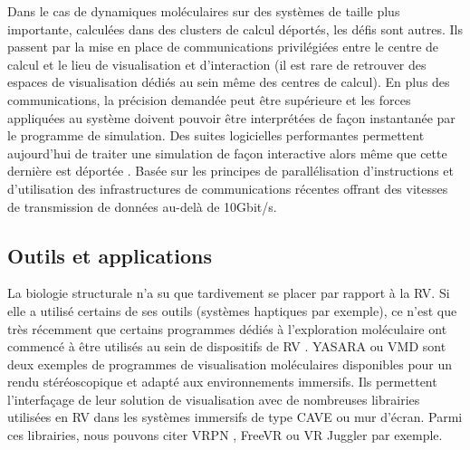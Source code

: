Dans le cas de dynamiques moléculaires sur des systèmes de taille plus importante, calculées dans des clusters de calcul déportés, les défis sont autres. Ils passent par la mise en place de communications privilégiées entre le centre de calcul et le lieu de visualisation et d'interaction (il est rare de retrouver des espaces de visualisation dédiés au sein même des centres de calcul). En plus des communications, la précision demandée peut être supérieure et les forces appliquées au système doivent pouvoir être interprétées de façon instantanée par le programme de simulation. Des suites logicielles performantes permettent aujourd'hui de traiter une simulation de façon interactive alors même que cette dernière est déportée \cite{dreher2014exaviz}. Basée sur les principes de parallélisation d'instructions et d'utilisation des infrastructures de communications récentes offrant des vitesses de transmission de données au-delà de 10Gbit/s.


\subsection{Outils et applications}

La biologie structurale n'a su que tardivement se placer par rapport à la RV. Si elle a utilisé certains de ses outils (systèmes haptiques par exemple), ce n'est que très récemment que certains programmes dédiés à l'exploration moléculaire ont commencé à être utilisés au sein de dispositifs de RV \cite{odonoghue_visualization_2010}.
 YASARA \cite{krieger2014yasara} ou VMD \cite{stone_immersive_2010} sont deux exemples de programmes de visualisation moléculaires disponibles pour un rendu stéréoscopique et adapté aux environnements immersifs. Ils permettent l'interfaçage de leur solution de visualisation avec de nombreuses librairies utilisées en RV dans les systèmes immersifs de type CAVE ou mur d'écran. Parmi ces librairies, nous pouvons citer VRPN \cite{taylor2001vrpn}, FreeVR \cite{pape2004commodity} ou VR Juggler par exemple.


